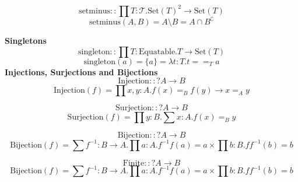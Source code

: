 \documentclass{article}
\newcommand{\Type}{\mathcal{T}}
\renewcommand{\.}{\; . \;}
\begin{document}
$$\mathrm{setminus} :: \prod T : \Type  .  \mathrm{Set}(T)^2 \to \mathrm{Set}(T) $$
$$\mathrm{setminus}(A,B) = A \setminus B = A \cap B^\complement  $$

\textbf{Singletons}
$$\mathrm{singleton} :: \prod T : \mathrm{Equatable} . T \to \mathrm{Set}(T)$$
$$\mathrm{singleton}(a)  = \{ a \} = \lambda t : T .t ==_T a$$
\textbf{Injections, Surjections and Bijections} 
$$\mathrm{Injection} :: ? A \to B$$
$$\mathrm{Injection}(f) = \prod x,y : A .  f(x) =_B f(y) \to x =_A y$$

$$\mathrm{Surjection} :: ? A \to B$$
$$\mathrm{Surjection}(f) = \prod y : B. \sum x : A .  f(x) =_B  y$$

$$\mathrm{Bijection} :: ? A \to B$$
$$\mathrm{Bijection}(f) = \sum f^{-1} : B \to A . \prod a : A . f^{-1}f(a) =a \times \prod b : B
. ff^{-1}(b) = b$$

$$\mathrm{Finite} :: ? A \to B$$
$$\mathrm{Bijection}(f) = \sum f^{-1} : B \to A . \prod a : A . f^{-1}f(a) =a \times \prod b : B
. ff^{-1}(b) = b$$
\end{document}
